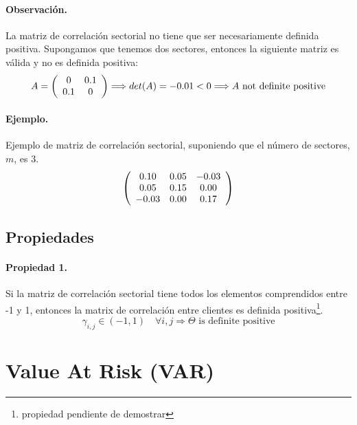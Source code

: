 \paragraph{Observaci\'on.} La matriz de correlaci\'on sectorial no tiene que 
ser necesariamente definida positiva. Supongamos que tenemos dos sectores, 
entonces la siguiente matriz es v\'alida y no es definida positiva:
\begin{displaymath}
A=\left(
\begin{array}{cc}
0 & 0.1 \cr
0.1 & 0
\end{array}
\right) \Longrightarrow det(A)=-0.01 < 0 \Longrightarrow A \textrm{ not definite positive}
\end{displaymath}

\paragraph{Ejemplo.} Ejemplo de matriz de correlaci\'on sectorial, suponiendo 
que el n\'umero de sectores, $m$, es 3.
\begin{displaymath}
\left(
\begin{array}{ccc}
 0.10 &  0.05 & -0.03 \cr
 0.05 &  0.15 &  0.00 \cr
-0.03 &  0.00 &  0.17
\end{array}
\right)
\end{displaymath}

\subsection{Propiedades} 

\paragraph{Propiedad 1.} Si la matriz de correlaci\'on sectorial tiene 
todos los elementos comprendidos entre -1 y 1, entonces la matrix de correlaci\'on 
entre clientes es definida positiva\footnote{propiedad pendiente de demostrar}.
\begin{displaymath}
\gamma_{i,j} \in (-1,1) \quad \forall i, j 
\Longrightarrow
\Theta \textrm{ is definite positive}
\end{displaymath}


\section{Value At Risk (VAR)}

